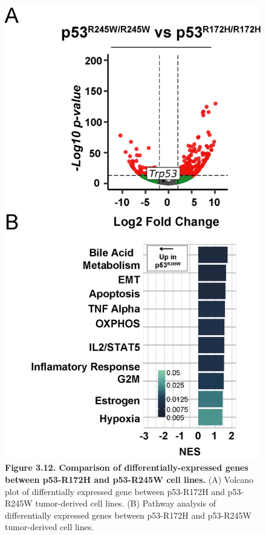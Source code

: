 \begin{figure}
\hypertarget{fig:3.12}{%
\centering
\includegraphics[width=1\textwidth,height=\textheight]{images/p5310.png}
\caption{\textbf{Figure 3.12. Comparison of differentially-expressed genes between p53-R172H and p53-R245W cell lines.} (A) Volcano plot of differntially expressed gene between p53-R172H and p53-R245W tumor-derived cell lines. (B) Pathway analysis of differentially expressed genes between p53-R172H and p53-R245W tumor-derived cell lines.}\label{fig:3.12}
}
\end{figure}

